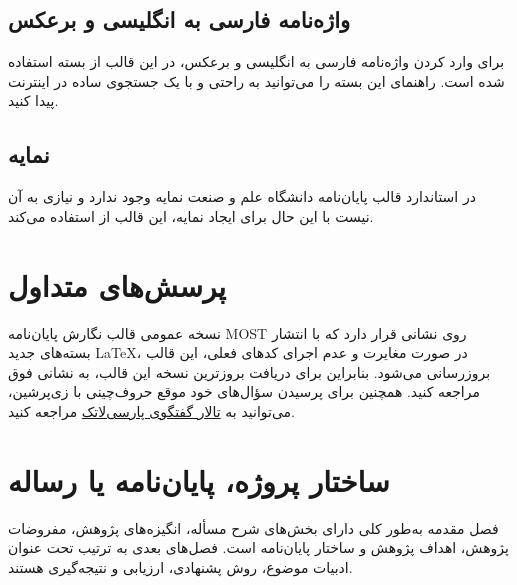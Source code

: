  \subsection{واژه‌نامه فارسی به انگلیسی و برعکس}
 برای وارد کردن واژه‌نامه فارسی به انگلیسی و برعکس، در این قالب از بسته
 استفاده شده است. راهنمای این بسته را می‌توانید به راحتی و با یک جستجوی ساده در اینترنت پیدا کنید.
 
 \subsection{نمایه}
 در استاندارد قالب پایان‌نامه دانشگاه علم و صنعت نمایه وجود ندارد و نیازی به آن نیست با این حال
 برای ایجاد نمایه، این قالب از 
 استفاده می‌کند.
 
 \section{پرسش‌های متداول}
نسخه عمومی قالب نگارش پایان‌نامه 
\gls{MOST}
روی نشانی 
\href{https://m-zakeri.github.io/ZMOST}{}
قرار دارد که با انتشار بسته‌های جدید 
\LaTeX،
در صورت مغایرت و عدم اجرای کدهای فعلی، این قالب بروزرسانی می‌شود. 
بنابراین برای دریافت بروزترین نسخه این قالب، به نشانی فوق مراجعه کنید.
 همچنین برای پرسیدن سؤال‌های خود موقع حروف‌چینی با زی‌پرشین،  می‌توانید به
 \href{http://forum.parsilatex.com}{تالار گفتگوی پارسی‌لاتک}%
 مراجعه کنید. 
 
\section{ساختار پروژه،  پایان‌نامه یا رساله}
 فصل مقدمه به‌طور کلی دارای بخش‌های شرح مسأله، انگيزه‌های پژوهش، مفروضات پژوهش، اهداف پژوهش و ساختار پايان‌نامه است. فصل‌های بعدی به ترتیب تحت عنوان ادبیات موضوع، روش‌ پشنهادی، ارزیابی و نتیجه‌گیری هستند.
 
